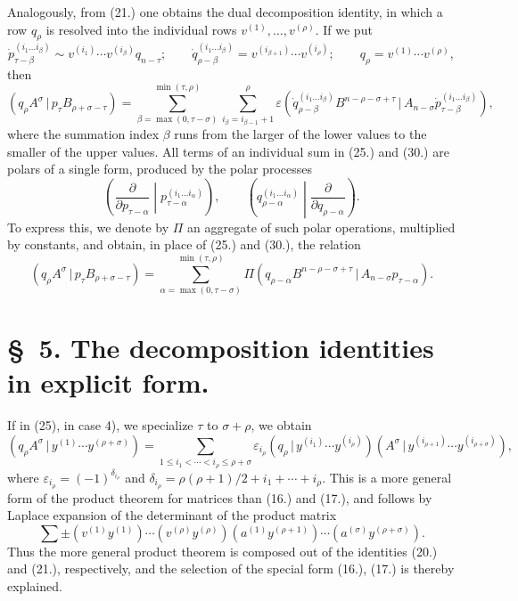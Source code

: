 \documentclass[11pt]{article}
\newcommand{\pair}[2]{(#1\,|\,#2)}
\newcommand{\eps}{\varepsilon}
\begin{document}
Analogously, from (21.) one obtains the dual decomposition identity, in which a row $q_\rho$ is resolved into the individual rows $v^{(1)},\ldots,v^{(\rho)}$. If we put
\begin{equation}
 \dot p_{\tau-\beta}^{(i_1\ldots i_\beta)}\sim v^{(i_1)}\cdots v^{(i_\beta)}q_{n-\tau};\qquad
 \dot q_{\rho-\beta}^{(i_1\ldots i_\beta)}=v^{(i_{\beta+1})}\cdots v^{(i_\rho)};\qquad
 q_\rho=v^{(1)}\cdots v^{(\rho)},
\tag{29}
\end{equation}
then
\begin{equation}
 \pair{q_\rho A^\sigma}{p_\tau B_{\rho+\sigma-\tau}}
 =\sum_{\beta=\max(0,\tau-\sigma)}^{\min(\tau,\rho)}
   \sum_{i_\beta=i_{\beta-1}+1}^{\rho}\eps
\pair{\dot q_{\rho-\beta}^{(i_1\ldots i_\beta)}B^{n-\rho-\sigma+\tau}}{A_{n-\sigma}\dot p_{\tau-\beta}^{(i_1\ldots i_\beta)}} ,
\tag{30}
\end{equation}
where the summation index $\beta$ runs from the larger of the lower values to the smaller of the upper values. All terms of an individual sum in (25.) and (30.) are polars of a single form, produced by the polar processes
\[
\left(\frac{\partial}{\partial p_{\tau-\alpha}}\middle|p_{\tau-\alpha}^{(i_1\ldots i_\alpha)}\right),\qquad
\left(q_{\rho-\alpha}^{(i_1\ldots i_\alpha)}\middle|\frac{\partial}{\partial q_{\rho-\alpha}}\right).
\]
To express this, we denote by $\Pi$ an aggregate of such polar operations, multiplied by constants, and obtain, in place of (25.) and (30.), the relation
\begin{equation}
 \pair{q_\rho A^\sigma}{p_\tau B_{\rho+\sigma-\tau}}
 =\sum_{\alpha=\max(0,\tau-\sigma)}^{\min(\tau,\rho)}
 \Pi\pair{q_{\rho-\alpha}B^{n-\rho-\sigma+\tau}}{A_{n-\sigma}p_{\tau-\alpha}}.
\tag{31}
\end{equation}

\section*{\S\ 5. The decomposition identities in explicit form.}
If in (25), in case 4), we specialize $\tau$ to $\sigma+\rho$, we obtain
\begin{equation}
 \pair{q_\rho A^\sigma}{y^{(1)}\cdots y^{(\rho+\sigma)}}
 =\sum_{1\le i_1<\cdots<i_\rho\le \rho+\sigma}
 \eps_{i_\rho}\pair{q_\rho}{y^{(i_1)}\cdots y^{(i_\rho)}}
 \pair{A^\sigma}{y^{(i_{\rho+1})}\cdots y^{(i_{\rho+\sigma})}},
\tag{32}
\end{equation}
where $\eps_{i_\rho}=(-1)^{\delta_{i_\rho}}$ and $\delta_{i_\rho}=\rho(\rho+1)/2+i_1+\cdots+i_\rho$. This is a more general form of the product theorem for matrices than (16.) and (17.), and follows by Laplace expansion of the determinant of the product matrix
\[
 \sum\pm(v^{(1)}y^{(1)})\cdots(v^{(\rho)}y^{(\rho)})(a^{(1)}y^{(\rho+1)})\cdots(a^{(\sigma)}y^{(\rho+\sigma)}).
\]
Thus the more general product theorem is composed out of the identities (20.) and (21.), respectively, and the selection of the special form (16.), (17.) is thereby explained.
\end{document}
